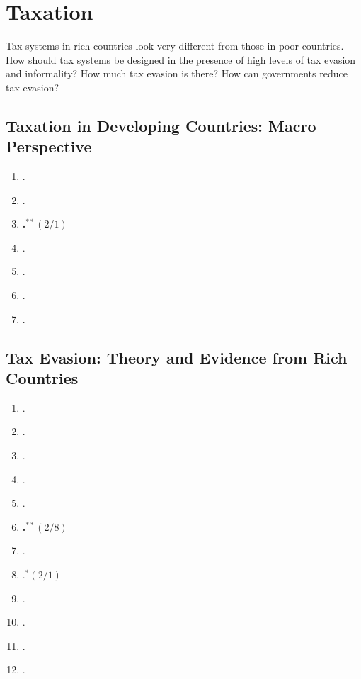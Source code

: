 \documentclass[11pt]{article}
\begin{document}
\section{Taxation}
Tax systems in rich countries look very different from those in poor countries. How should tax systems be designed in the presence of high levels of tax evasion and informality? How much tax evasion is there? How can governments reduce tax evasion?

\subsection{Taxation in Developing Countries: Macro Perspective}

\begin{enumerate}
\item {}.
\item {}.
\item \textbf{.$^{**}(2/1)$}
\item {}.
\item {}.
\item {}.
\item {}.
\end{enumerate}

\subsection{Tax Evasion: Theory and Evidence from Rich Countries}

\begin{enumerate}
\item {}.
\item {}.
\item {}.
\item {}.
\item {}.
\item \textbf{.$^{**}(2/8)$}
\item {}.
\item {}.$^{*}(2/1)$
\item {}.
\item {}.
\item {}.
\item {}.
\end{enumerate}
\end{document}
